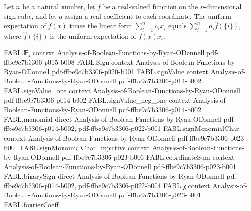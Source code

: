 \begin{theorem}
\label{FABL.expect_mul_linearForm_eq}
\leanok
{}
Let $n$ be a natural number, let $f$ be a real-valued function on the $n$-dimensional
sign cube, and let $a$ assign a real coefficient to each coordinate. The uniform
expectation of $f(x)$ times the linear form $\sum_{i=1}^n a_i x_i$ equals $\sum_{i=1}^n
a_i\widehat f(\{i\})$, where $\widehat f(\{i\})$ is the uniform expectation of
$f(x)x_i$.
\end{theorem}

\begin{theorem}
\label{FABL.thresholdSign_gap_eq}
\leanok
{}
\proofstep
  {FABL.𝔽₂}
  {context}
  {Analysis-of-Boolean-Functions-by-Ryan-ODonnell}
  {pdf-ffbe9c7b3306-p015-b008}
\proofstep
  {FABL.Sign}
  {context}
  {Analysis-of-Boolean-Functions-by-Ryan-ODonnell}
  {pdf-ffbe9c7b3306-p020-b001}
\proofstep
  {FABL.signValue}
  {context}
  {Analysis-of-Boolean-Functions-by-Ryan-ODonnell}
  {pdf-ffbe9c7b3306-p014-b002}
\proofstep
  {FABL.signValue_one}
  {context}
  {Analysis-of-Boolean-Functions-by-Ryan-ODonnell}
  {pdf-ffbe9c7b3306-p014-b002}
\proofstep
  {FABL.signValue_neg_one}
  {context}
  {Analysis-of-Boolean-Functions-by-Ryan-ODonnell}
  {pdf-ffbe9c7b3306-p014-b002}
\proofstep
  {FABL.monomial}
  {direct}
  {Analysis-of-Boolean-Functions-by-Ryan-ODonnell}
  {pdf-ffbe9c7b3306-p014-b002,
    pdf-ffbe9c7b3306-p022-b001}
\proofstep
  {FABL.signMonomialChar}
  {context}
  {Analysis-of-Boolean-Functions-by-Ryan-ODonnell}
  {pdf-ffbe9c7b3306-p023-b001}
\proofstep
  {FABL.signMonomialChar_injective}
  {context}
  {Analysis-of-Boolean-Functions-by-Ryan-ODonnell}
  {pdf-ffbe9c7b3306-p023-b006}
\proofstep
  {FABL.coordinateSum}
  {context}
  {Analysis-of-Boolean-Functions-by-Ryan-ODonnell}
  {pdf-ffbe9c7b3306-p023-b001}
\proofstep
  {FABL.binarySign}
  {direct}
  {Analysis-of-Boolean-Functions-by-Ryan-ODonnell}
  {pdf-ffbe9c7b3306-p014-b002,
    pdf-ffbe9c7b3306-p022-b004}
\proofstep
  {FABL.χ}
  {context}
  {Analysis-of-Boolean-Functions-by-Ryan-ODonnell}
  {pdf-ffbe9c7b3306-p023-b001}
\proofstep
  {FABL.fourierCoeff}

\end{theorem}
